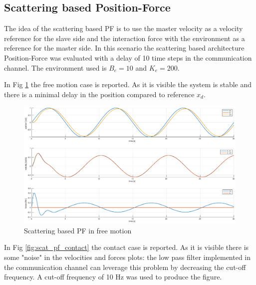 \documentclass[a4paper,12pt]{article}
\begin{document}
\newpage
\subsection{Scattering based Position-Force}

The idea of the scattering based PF is to use the master velocity as a velocity reference for the slave side and the interaction force with the environment as a reference for the master side. In this scenario the scattering based architecture Position-Force was evaluated with a delay of 10 time steps in the communication channel. The environment used is $B_e = 10$ and $K_e = 200$. 

\bigskip
In Fig \ref{fig:scat_pf_free} the free motion case is reported. As it is visible the system is stable and there is a minimal delay in the position compared to reference $x_d$.

\begin{figure}[H]
    \begin{center}
        \hspace*{-4.5cm}
        \includegraphics[scale=0.5]{images/scat_pf_free.eps}
    \end{center}
    \caption{Scattering based PF in free motion}
    \label{fig:scat_pf_free}
\end{figure}

\newpage
In Fig \ref{fig:scat_pf_contact} the contact case is reported. As it is visible there is some "noise" in the velocities and forces plots: the low pass filter implemented in the communication channel can leverage this problem by decreasing the cut-off frequency. A cut-off frequency of 10 Hz was used to produce the figure.
\end{document}
